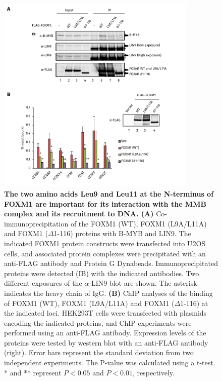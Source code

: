 \begin{figure}[!h]
    \centering
    \includegraphics[width=0.85\textwidth]{chapter3/figures_foxm1/fig34.pdf}
    \caption[The two amino acids Leu9 and Leu11 at the N-terminus of FOXM1 are important for its interaction with the MMB complex and its recruitment to DNA]{\textbf{The two amino acids Leu9 and Leu11 at the N-terminus of FOXM1 are important for its interaction with the MMB complex and its recruitment to DNA. (A)} Co-immunoprecipitation of the FOXM1 (WT), FOXM1 (L9A/L11A) and FOXM1 ($\Delta$1-116) proteins with B-MYB and LIN9. The indicated FOXM1 protein constructs were transfected into U2OS cells, and associated protein complexes were precipitated with an anti-FLAG antibody and Protein G Dynabeads. Immunoprecipitated proteins were detected (IB) with the indicated antibodies. Two different exposures of the $\alpha$-LIN9 blot are shown. The asterisk indicates the heavy chain of IgG. \textbf{(B)} ChIP analyses of the binding of FOXM1 (WT), FOXM1 (L9A/L11A) and FOXM1 ($\Delta$1-116) at the indicated loci. HEK293T cells were transfected with plasmids encoding the indicated proteins, and ChIP experiments were performed using an anti-FLAG antibody. Expression levels of the proteins were tested by western blot with an anti-FLAG antibody (right). Error bars represent the standard deviation from two independent experiments. The P-value was calculated using a t-test. * and ** represent $P<0.05$ and $P<0.01$, respectively.}
    \label{fig:fig34}
\end{figure}

